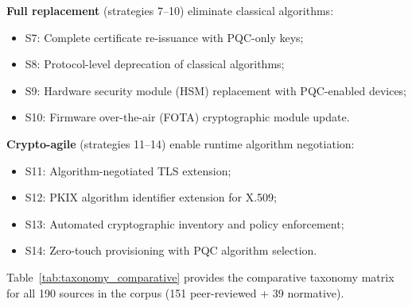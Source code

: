 \documentclass[journal]{IEEEtran}
\begin{document}
\textbf{Full replacement} (strategies 7--10) eliminate classical algorithms:
\begin{itemize}
  \item S7: Complete certificate re-issuance with PQC-only keys;
  \item S8: Protocol-level deprecation of classical algorithms;
  \item S9: Hardware security module (HSM) replacement with PQC-enabled devices;
  \item S10: Firmware over-the-air (FOTA) cryptographic module update.
\end{itemize}

\textbf{Crypto-agile} (strategies 11--14) enable runtime algorithm negotiation:
\begin{itemize}
  \item S11: Algorithm-negotiated TLS extension;
  \item S12: PKIX algorithm identifier extension for X.509;
  \item S13: Automated cryptographic inventory and policy enforcement;
  \item S14: Zero-touch provisioning with PQC algorithm selection.
\end{itemize}

Table~\ref{tab:taxonomy_comparative} provides the comparative taxonomy matrix
for all 190 sources in the corpus (151 peer-reviewed + 39 normative).
\end{document}
